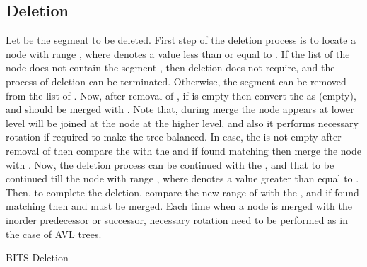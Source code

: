 \documentclass{article}
\begin{document}
\subsection{Deletion}  
Let  be the segment to be deleted. First step of the deletion process is to locate a node  with range , where  denotes a value less than or equal to . If the list of the node  does not contain the segment , then deletion does not require, and the process of deletion can be terminated. Otherwise, the segment  can be removed from the list of . Now, after removal of , if  is empty then convert the  as  (empty), and  should be merged with . Note that, during merge the node appears at lower level will be joined at the node at the higher level, and also it performs necessary rotation if required to make the tree balanced. In case, the  is not empty after removal of  then compare the  with the  and if found matching then merge the node  with . Now, the deletion process can be continued with the , and that to be continued till the node  with range , where  denotes a value greater than equal to . Then, to complete the deletion, compare the new range of  with the , and if found matching then  and  must be merged. Each time when a node is merged with the inorder predecessor or successor, necessary rotation need to be performed as in the case of AVL trees.
\par
\begin{algorithm}
\caption{BITS-Deletion}\label{a2}
\end{algorithm}
\end{document}
